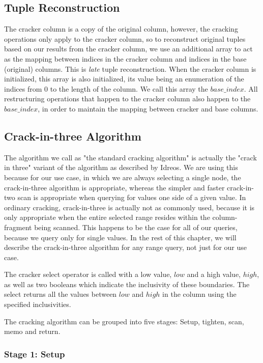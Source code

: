 \subsection{Tuple Reconstruction}

The cracker column is a copy of the original column, however, the cracking operations only apply to the cracker column, so to reconstruct original tuples based on our results from the cracker column, we use an additional array to act as the mapping between indices in the cracker column and indices in the base (original) columns. This is \textit{late} tuple reconstruction. When the cracker column is initialized, this array is also initialized, its value being an enumeration of the indices from 0 to the length of the column. We call this array the $base\_index$. All restructuring operations that happen to the cracker column also happen to the $base\_index$, in order to maintain the mapping between cracker and base columns.

\subsection{Crack-in-three Algorithm}

The algorithm we call as "the standard cracking algorithm" is actually the "crack in three" variant of the algorithm as described by Idreos. We are using this because for our use case, in which we are always selecting a single node, the crack-in-three algorithm is appropriate, whereas the simpler and faster crack-in-two scan is appropriate when querying for values one side of a given value. In ordinary cracking, crack-in-three is actually not as commonly used, because it is only appropriate when the entire selected range resides within the column-fragment being scanned. This happens to be the case for all of our queries, because we query only for single values. In the rest of this chapter, we will describe the crack-in-three algorithm for any range query, not just for our use case.

The cracker select operator is called with a low value, $low$ and a high value, $high$, as well as two booleans which indicate the inclusivity of these boundaries. The select returns all the values between $low$ and $high$ in the column using the specified inclusivities.

The cracking algorithm can be grouped into five stages: Setup, tighten, scan, memo and return.

\subsubsection{Stage 1: Setup}

